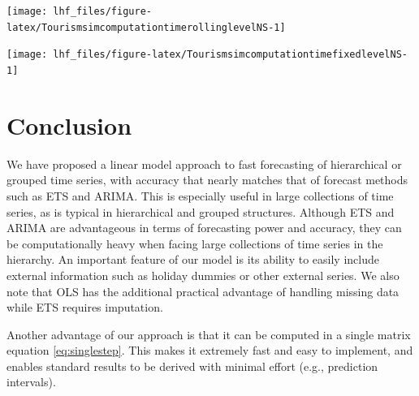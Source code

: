 \documentclass[11pt,a4paper,]{article}
\let\origfigure\figure
\let\endorigfigure\endfigure
\renewenvironment{figure}[1][2] {
    \expandafter\origfigure\expandafter[!htbp]
} {
    \endorigfigure
}
\begin{document}
\begin{figure}

{\centering \texttt{[image: lhf\_files/figure-latex/TourismsimcomputationtimerollinglevelNS-1]} 

}

\caption{Computation time (seconds) for ETS, ARIMA and OLS with and without reconciliation - Rolling origin forecasts with 8, 10, 12 and 18 levels of hierarchy with 304, 608, 1520 and 3040 number of bottom level series - two years forecast points with 0.5 error value.}\label{fig:TourismsimcomputationtimerollinglevelNS}
\end{figure}

\begin{figure}

{\centering \texttt{[image: lhf\_files/figure-latex/TourismsimcomputationtimefixedlevelNS-1]} 

}

\caption{Computation time (seconds) for ETS, ARIMA and OLS with and without reconciliation - Fixed origin forecasts with 8, 10, 12 and 18 levels of hierarchy with 304, 608, 1520 and 3040 number of bottom level series - two years forecast points with 0.5 error value.}\label{fig:TourismsimcomputationtimefixedlevelNS}
\end{figure}

\FloatBarrier

\hypertarget{conclusion}{%
\section{Conclusion}\label{conclusion}}

We have proposed a linear model approach to fast forecasting of hierarchical or grouped time series, with accuracy that nearly matches that of forecast methods such as ETS and ARIMA. This is especially useful in large collections of time series, as is typical in hierarchical and grouped structures. Although ETS and ARIMA are advantageous in terms of forecasting power and accuracy, they can be computationally heavy when facing large collections of time series in the hierarchy. An important feature of our model is its ability to easily include external information such as holiday dummies or other external series. We also note that OLS has the additional practical advantage of handling missing data while ETS requires imputation.

Another advantage of our approach is that it can be computed in a single matrix equation \eqref{eq:singlestep}. This makes it extremely fast and easy to implement, and enables standard results to be derived with minimal effort (e.g., prediction intervals).
\end{document}
